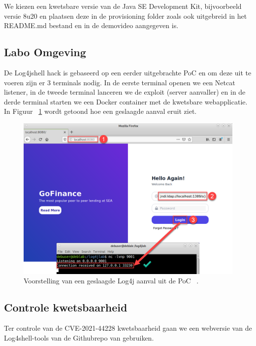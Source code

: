 \documentclass{hogent-article}
\begin{document}
We kiezen een kwetsbare versie van de Java SE Development Kit, bijvoorbeeld versie 8u20 \autocite{Oracle2014} en plaatsen deze in de provisioning folder zoals ook uitgebreid in het README.md bestand en in de demovideo aangegeven is.

\subsection{Labo Omgeving}

De Log4jshell hack is gebaseerd op een eerder uitgebrachte PoC \autocite{Kozmer2022} en om deze uit te voeren zijn er 3 terminals nodig. In de eerste terminal openen we een Netcat listener, in de tweede terminal lanceren we de exploit (server aanvaller) en in de derde terminal starten we een Docker container met de kwetsbare webapplicatie.
In Figuur ~\ref{fig:log4shell-poc} wordt getoond hoe een geslaagde aanval eruit ziet.
\begin{figure}[!ht]
    \centering
    \includegraphics[width=1\linewidth]{img/log4shell-poc.png}
    \caption{Voorstelling van een geslaagde Log4j aanval uit de PoC ~\autocite{Akkurt2022}.}
    \label{fig:log4shell-poc}
\end{figure}

\subsection{Controle kwetsbaarheid}

Ter controle van de CVE-2021-44228 kwetsbaarheid gaan we een webversie van de Log4shell-tools \autocite{Bakker2022b} van de Githubrepo van \textcite{Bakker2022a} gebruiken.
\end{document}
